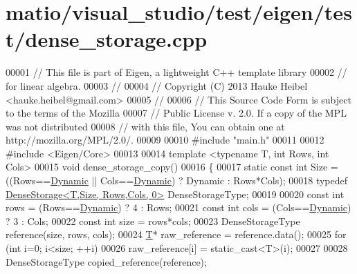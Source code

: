 \hypertarget{matio_2visual__studio_2test_2eigen_2test_2dense__storage_8cpp_source}{}\section{matio/visual\+\_\+studio/test/eigen/test/dense\+\_\+storage.cpp}
\label{matio_2visual__studio_2test_2eigen_2test_2dense__storage_8cpp_source}

\begin{DoxyCode}
00001 \textcolor{comment}{// This file is part of Eigen, a lightweight C++ template library}
00002 \textcolor{comment}{// for linear algebra.}
00003 \textcolor{comment}{//}
00004 \textcolor{comment}{// Copyright (C) 2013 Hauke Heibel <hauke.heibel@gmail.com>}
00005 \textcolor{comment}{//}
00006 \textcolor{comment}{// This Source Code Form is subject to the terms of the Mozilla}
00007 \textcolor{comment}{// Public License v. 2.0. If a copy of the MPL was not distributed}
00008 \textcolor{comment}{// with this file, You can obtain one at http://mozilla.org/MPL/2.0/.}
00009 
00010 \textcolor{preprocessor}{#include "main.h"}
00011 
00012 \textcolor{preprocessor}{#include <Eigen/Core>}
00013 
00014 \textcolor{keyword}{template} <\textcolor{keyword}{typename} T, \textcolor{keywordtype}{int} Rows, \textcolor{keywordtype}{int} Cols>
00015 \textcolor{keywordtype}{void} dense\_storage\_copy()
00016 \{
00017   \textcolor{keyword}{static} \textcolor{keyword}{const} \textcolor{keywordtype}{int} Size = ((Rows==\hyperlink{namespace_eigen_ad81fa7195215a0ce30017dfac309f0b2}{Dynamic} || Cols==\hyperlink{namespace_eigen_ad81fa7195215a0ce30017dfac309f0b2}{Dynamic}) ? Dynamic : Rows*Cols);
00018   \textcolor{keyword}{typedef} \hyperlink{class_eigen_1_1_dense_storage}{DenseStorage<T,Size, Rows,Cols, 0>} DenseStorageType;
00019   
00020   \textcolor{keyword}{const} \textcolor{keywordtype}{int} rows = (Rows==\hyperlink{namespace_eigen_ad81fa7195215a0ce30017dfac309f0b2}{Dynamic}) ? 4 : Rows;
00021   \textcolor{keyword}{const} \textcolor{keywordtype}{int} cols = (Cols==\hyperlink{namespace_eigen_ad81fa7195215a0ce30017dfac309f0b2}{Dynamic}) ? 3 : Cols;
00022   \textcolor{keyword}{const} \textcolor{keywordtype}{int} size = rows*cols;
00023   DenseStorageType reference(size, rows, cols);
00024   \hyperlink{group___sparse_core___module}{T}* raw\_reference = reference.data();
00025   \textcolor{keywordflow}{for} (\textcolor{keywordtype}{int} i=0; i<size; ++i)
00026     raw\_reference[i] = static\_cast<T>(i);
00027     
00028   DenseStorageType copied\_reference(reference);

\end{DoxyCode}
